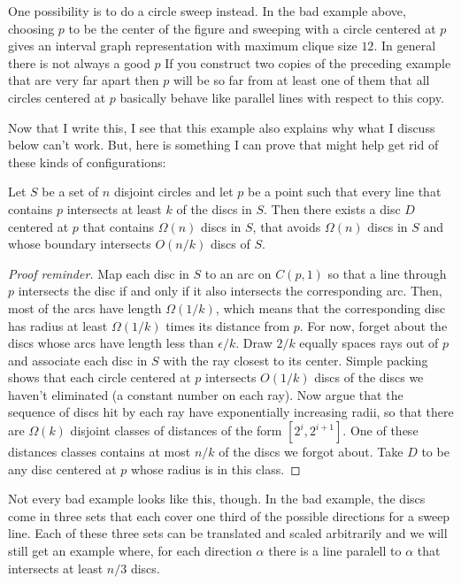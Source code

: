 \documentclass{patmorin}
\begin{document}
One possibility is to do a circle sweep instead. In the bad example above, choosing $p$ to be the center of the figure and sweeping with a circle centered at $p$ gives an interval graph representation with maximum clique size $12$.  In general there is not always a good $p$  If you construct two copies of the preceding example that are very far apart then $p$ will be so far from at least one of them that all circles centered at $p$ basically behave like parallel lines with respect to this copy.

Now that I write this, I see that this example also explains why what I discuss below can't work.  But, here is something I can prove that might help get rid of these kinds of configurations:

\begin{lem}
  Let $S$ be a set of $n$ disjoint circles and let $p$ be a point such that every line that contains $p$ intersects at least $k$ of the discs in $S$.  Then there exists a disc $D$ centered at $p$ that contains $\Omega(n)$ discs in $S$, that avoids $\Omega(n)$ discs in $S$ and whose boundary intersects $O(n/k)$ discs of $S$.
\end{lem}

\begin{proof}[Proof reminder]
  Map each disc in $S$ to an arc on $C(p,1)$ so that a line through $p$ intersects the disc if and only if it also intersects the corresponding arc.  Then, most of the arcs have length $\Omega(1/k)$, which means that the corresponding disc has radius at least $\Omega(1/k)$ times its distance from $p$.  For now, forget about the discs whose arcs have length less than $\epsilon/ k$.  Draw $2/k$ equally spaces rays out of $p$ and associate each disc in $S$ with the ray closest to its center.  Simple packing shows that each circle centered at $p$ intersects $O(1/k)$ discs of the discs we haven't eliminated (a constant number on each ray).  Now argue that the sequence of discs hit by each ray have exponentially increasing radii, so that there are  $\Omega(k)$ disjoint classes of distances of the form $[2^i,2^{i+1}]$.  One of these distances classes contains at most $n/k$ of the discs we forgot about.  Take $D$ to be any disc centered at $p$ whose radius is in this class.
\end{proof}

Not every bad example looks like this, though.  In the bad example, the discs come in three sets that each cover one third of the possible directions for a sweep line.  Each of these three sets can be translated and scaled arbitrarily and we will still get an example where, for each direction $\alpha$ there is a line paralell to $\alpha$ that intersects at least $n/3$ discs.
\end{document}
